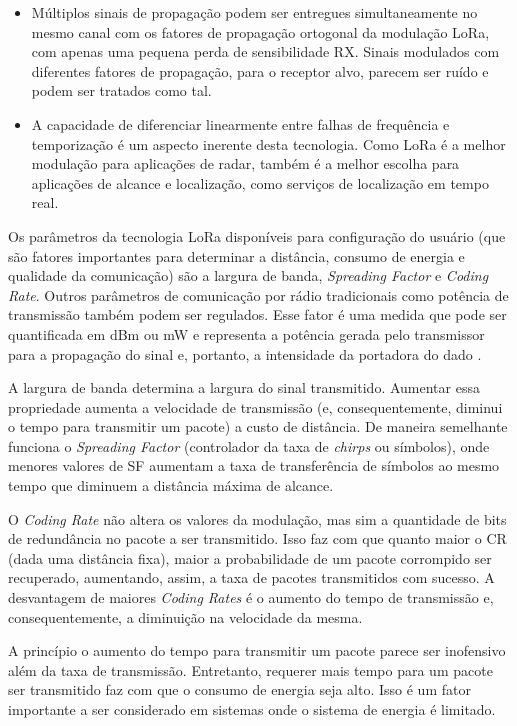 \documentclass[
	12pt,				%
	openright,			%
	twoside,			%
	a4paper,			%
	english,			%
	french,				%
	spanish,			%
	brazil				%
	]{abntex2}
\begin{document}
\begin{itemize}
    \item Múltiplos sinais de propagação podem ser entregues simultaneamente no mesmo canal com os fatores de propagação ortogonal da modulação LoRa, com apenas uma pequena perda de sensibilidade RX. Sinais modulados com diferentes fatores de propagação, para o receptor alvo, parecem ser ruído e podem ser tratados como tal.
    \item A capacidade de diferenciar linearmente entre falhas de frequência e temporização é um aspecto inerente desta tecnologia. Como LoRa é a melhor modulação para aplicações de radar, também é a melhor escolha para aplicações de alcance e localização, como serviços de localização em tempo real.
\end{itemize}

Os parâmetros da tecnologia LoRa disponíveis para configuração do usuário (que são fatores importantes para determinar a distância, consumo de energia e qualidade da comunicação) são a largura de banda, \emph{Spreading Factor} e \emph{Coding Rate}. Outros parâmetros de comunicação por rádio tradicionais como potência de transmissão também podem ser regulados. Esse fator é uma medida que pode ser quantificada em dBm ou mW e representa a potência gerada pelo transmissor para a propagação do sinal e, portanto, a intensidade da portadora do dado \cite{restivo_2019}.

A largura de banda determina a largura do sinal transmitido. Aumentar essa propriedade aumenta a velocidade de transmissão (e, consequentemente, diminui o tempo para transmitir um pacote) a custo de distância. De maneira semelhante funciona o \emph{Spreading Factor} (controlador da taxa de \emph{chirps} ou símbolos), onde menores valores de SF aumentam a taxa de transferência de símbolos ao mesmo tempo que diminuem a distância máxima de alcance.

O \emph{Coding Rate} não altera os valores da modulação, mas sim a quantidade de bits de redundância no pacote a ser transmitido. Isso faz com que quanto maior o CR (dada uma distância fixa), maior a probabilidade de um pacote corrompido ser recuperado, aumentando, assim, a taxa de pacotes transmitidos com sucesso. A desvantagem de maiores \emph{Coding Rates} é o aumento do tempo de transmissão e, consequentemente, a diminuição na velocidade da mesma.

A princípio o aumento do tempo para transmitir um pacote parece ser inofensivo além da taxa de transmissão. Entretanto, requerer mais tempo para um pacote ser transmitido faz com que o consumo de energia seja alto. Isso é um fator importante a ser considerado em sistemas onde o sistema de energia é limitado.
\end{document}
